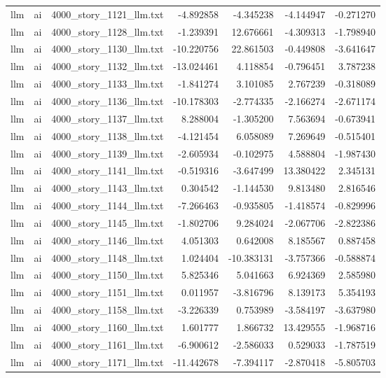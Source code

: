 \begin{longtable}{lllrrrr}
llm & ai & 4000\_story\_1121\_llm.txt & -4.892858 & -4.345238 & -4.144947 & -0.271270 \\
llm & ai & 4000\_story\_1128\_llm.txt & -1.239391 & 12.676661 & -4.309313 & -1.798940 \\
llm & ai & 4000\_story\_1130\_llm.txt & -10.220756 & 22.861503 & -0.449808 & -3.641647 \\
llm & ai & 4000\_story\_1132\_llm.txt & -13.024461 & 4.118854 & -0.796451 & 3.787238 \\
llm & ai & 4000\_story\_1133\_llm.txt & -1.841274 & 3.101085 & 2.767239 & -0.318089 \\
llm & ai & 4000\_story\_1136\_llm.txt & -10.178303 & -2.774335 & -2.166274 & -2.671174 \\
llm & ai & 4000\_story\_1137\_llm.txt & 8.288004 & -1.305200 & 7.563694 & -0.673941 \\
llm & ai & 4000\_story\_1138\_llm.txt & -4.121454 & 6.058089 & 7.269649 & -0.515401 \\
llm & ai & 4000\_story\_1139\_llm.txt & -2.605934 & -0.102975 & 4.588804 & -1.987430 \\
llm & ai & 4000\_story\_1141\_llm.txt & -0.519316 & -3.647499 & 13.380422 & 2.345131 \\
llm & ai & 4000\_story\_1143\_llm.txt & 0.304542 & -1.144530 & 9.813480 & 2.816546 \\
llm & ai & 4000\_story\_1144\_llm.txt & -7.266463 & -0.935805 & -1.418574 & -0.829996 \\
llm & ai & 4000\_story\_1145\_llm.txt & -1.802706 & 9.284024 & -2.067706 & -2.822386 \\
llm & ai & 4000\_story\_1146\_llm.txt & 4.051303 & 0.642008 & 8.185567 & 0.887458 \\
llm & ai & 4000\_story\_1148\_llm.txt & 1.024404 & -10.383131 & -3.757366 & -0.588874 \\
llm & ai & 4000\_story\_1150\_llm.txt & 5.825346 & 5.041663 & 6.924369 & 2.585980 \\
llm & ai & 4000\_story\_1151\_llm.txt & 0.011957 & -3.816796 & 8.139173 & 5.354193 \\
llm & ai & 4000\_story\_1158\_llm.txt & -3.226339 & 0.753989 & -3.584197 & -3.637980 \\
llm & ai & 4000\_story\_1160\_llm.txt & 1.601777 & 1.866732 & 13.429555 & -1.968716 \\
llm & ai & 4000\_story\_1161\_llm.txt & -6.900612 & -2.586033 & 0.529033 & -1.787519 \\
llm & ai & 4000\_story\_1171\_llm.txt & -11.442678 & -7.394117 & -2.870418 & -5.805703 \\

\end{longtable}
